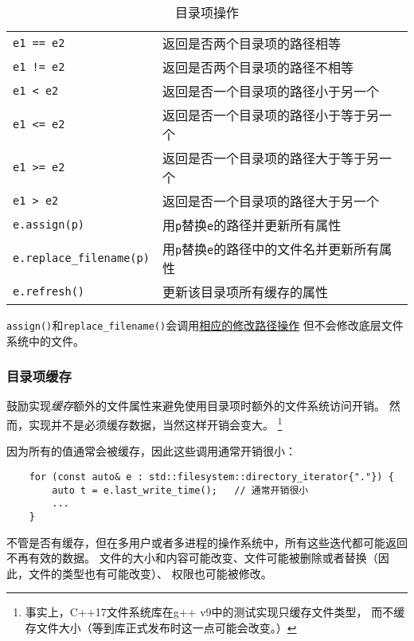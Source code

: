 \begin{table}[ht]
\begin{tabular}{l|l}
        \texttt{e1 == e2}                & 返回是否两个目录项的路径相等                            \\
        \texttt{e1 != e2}                & 返回是否两个目录项的路径不相等                           \\
        \texttt{e1 < e2}                 & 返回是否一个目录项的路径小于另一个                         \\
        \texttt{e1 <= e2}                & 返回是否一个目录项的路径小于等于另一个                       \\
        \texttt{e1 >= e2}                & 返回是否一个目录项的路径大于等于另一个                       \\
        \texttt{e1 > e2}                 & 返回是否一个目录项的路径大于另一个                         \\
        \texttt{e.assign(p)}             & 用\texttt{p}替换\texttt{e}的路径并更新所有属性         \\
        \texttt{e.replace\_filename(p)}  & 用\texttt{p}替换\texttt{e}的路径中的文件名并更新所有属性    \\
        \texttt{e.refresh()}             & 更新该目录项所有缓存的属性                             \\
        \hline
    \end{tabular}
    \caption{目录项操作}
    \label{t20.22}
\end{table}

\texttt{assign()}和\texttt{replace\_filename()}会调用\hyperref[ch20.3.5]{相应的修改路径操作}
但不会修改底层文件系统中的文件。

\subsubsection{目录项缓存}
鼓励实现\emph{缓存}额外的文件属性来避免使用目录项时额外的文件系统访问开销。
然而，实现并不是必须缓存数据，当然这样开销会变大。
\footnote{事实上，C++17文件系统库在g++ v9中的测试实现只缓存文件类型，
而不缓存文件大小（等到库正式发布时这一点可能会改变。）}

因为所有的值通常会被缓存，因此这些调用通常开销很小：
\begin{lstlisting}
    for (const auto& e : std::filesystem::directory_iterator{"."}) {
        auto t = e.last_write_time();   // 通常开销很小
        ...
    }
\end{lstlisting}
不管是否有缓存，但在多用户或者多进程的操作系统中，所有这些迭代都可能返回不再有效的数据。
文件的大小和内容可能改变、文件可能被删除或者替换（因此，文件的类型也有可能改变）、
权限也可能被修改。

